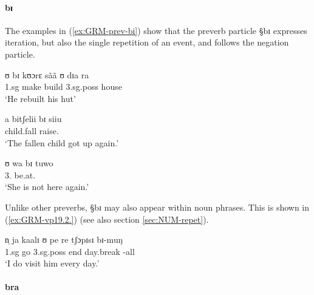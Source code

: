 


\paragraph{bɪ}
\label{sec:GRM-preverb-iteration}


The examples in (\ref{ex:GRM-prev-bi}) show that  the preverb particle {\S bɪ} 
expresses iteration, but also the single repetition of an event,  and follows
the negation particle. 


\begin{exe} 

\ex\label{ex:GRM-prev-bi}
\begin{xlist}
\ex\label{ex:vp33.2.}
\gll ʊ bɪ kʊɔrɛ sãã ʊ dɪa ra \\
 {\sc 1.sg}     {\itr} make build {\sc 3.sg.poss} house {\foc}    \\
\glt  `He rebuilt his hut' 


\ex\label{ex:GRM-vp10.4}
\gll a bitʃelii bɪ siiu\\
 {\art}  child.fall   {\itr} raise.{\foc}    \\
\glt  `The fallen child got up again.' 



\ex\label{ex:vp10.4.}
\gll ʊ wa bɪ tuwo \\
       {3.\sg} {\neg} {\itr} be.at.{\neg} \\
\glt  `She is not here again.' 
\end{xlist}
\end{exe} 


Unlike other preverbs,  {\S bɪ} may also
appear within noun phrases. This is shown in (\ref{ex:GRM-vp19.2.})  (see also
section \ref{sec:NUM-repet}).



\begin{exe} 
\ex\label{ex:GRM-vp19.2.}
\gll  n̩ ja  kaalɪ ʊ pe re tʃɔpɪsɪ bɪ-muŋ \\
{\sc 1.sg} {\hab} go {\sc 3.sg.poss} end {\foc}  day.break {\itr}-all\\
\glt  `I do visit him every day.' 

\end{exe} 



 \paragraph{bra}
\label{sec:GRM-preverb-return}

